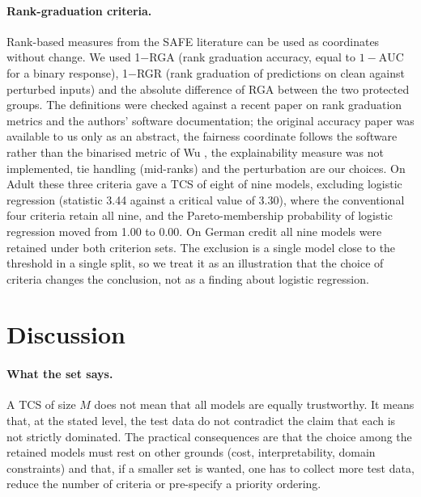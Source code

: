 \documentclass[pdflatex,sn-mathphys-num,iicol]{sn-jnl}
\theoremstyle{thmstyleone}
\theoremstyle{thmstyletwo}
\begin{document}
\paragraph{Rank-graduation criteria.} Rank-based measures from the SAFE literature can be used as coordinates without change. We used 1$-$RGA (rank graduation accuracy, equal to $1-\mathrm{AUC}$ for a binary response), 1$-$RGR (rank graduation of predictions on clean against perturbed inputs) and the absolute difference of RGA between the two protected groups. The definitions were checked against a recent paper on rank graduation metrics \cite{auricchio2025} and the authors' software documentation; the original accuracy paper \cite{raffinetti2023} was available to us only as an abstract, the fairness coordinate follows the software rather than the binarised metric of Wu \cite{wu2026safe}, the explainability measure was not implemented, tie handling (mid-ranks) and the perturbation are our choices. On Adult these three criteria gave a TCS of eight of nine models, excluding logistic regression (statistic 3.44 against a critical value of 3.30), where the conventional four criteria retain all nine, and the Pareto-membership probability of logistic regression moved from 1.00 to 0.00. On German credit all nine models were retained under both criterion sets. The exclusion is a single model close to the threshold in a single split, so we treat it as an illustration that the choice of criteria changes the conclusion, not as a finding about logistic regression.

\section{Discussion}\label{sec:disc}
\paragraph{What the set says.} A TCS of size $M$ does not mean that all models are equally trustworthy. It means that, at the stated level, the test data do not contradict the claim that each is not strictly dominated. The practical consequences are that the choice among the retained models must rest on other grounds (cost, interpretability, domain constraints) and that, if a smaller set is wanted, one has to collect more test data, reduce the number of criteria or pre-specify a priority ordering.
\end{document}
